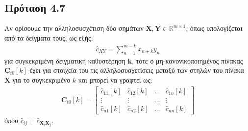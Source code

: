 \subsection*{\small{Πρόταση 4.7}}
Αν ορίσουμε την αλληλοσυσχέτιση δύο σημάτων $\mathbf{X},\mathbf{Y} \in \mathbb{R}^{m \times 1}$, όπως υπολογίζεται από τα δείγματα τους, ως εξής:
\begin{align*}
    \hat{c}_{XY} = \sum \limits_{n=1}^{m-k} x_{n+k} y_n
\end{align*}
για συγκεκριμένη δειγματική καθυστέρηση $\mathbf{k}$, τότε ο μη-κανονικοποιημένος πίνακας $\mathbf{C}_{t0}[k]$ έχει για στοιχεία του τις αλληλοσυσχετίσεις μεταξύ των στηλών του πίνακα $\mathbf{Χ}$ για το συγκεκριμένο $k$ και μπορεί να γραφτεί ως:
\begin{align*}
    \mathbf{C}_{t0}[k] = 
    \begin{bmatrix}
    \hat{c}_{11}[k] & \hat{c}_{12}[k] & \ldots & \hat{c}_{1n}[k] \\
    \vdots & \vdots & \ldots & \vdots \\
    \hat{c}_{n1}[k] & \hat{c}_{n2}[k] & \ldots & \hat{c}_{nn}[k]
    \end{bmatrix}
\end{align*}
όπου $ \hat{c}_{ij} = \hat{c}_{\mathbf{X}_{i} \mathbf{X}_{j}}$.
